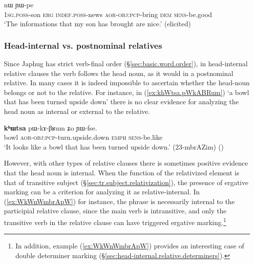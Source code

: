 \begin{exe}
\ex \label{ex:tWtCha.jAkAGWt}
 nɯ ɲɯ-pe \\
\textsc{1sg}.\textsc{poss}-son \textsc{erg} \textsc{indef}.\textsc{poss}-news \textsc{aor}-\textsc{obj}:\textsc{pcp}-bring \textsc{dem} \textsc{sens}-be.good \\
\glt `The informations that my son has brought are nice.' (elicited)
\end{exe} 
  
\subsubsection{Head-internal vs. postnominal relatives} \label{sec:head-internal.relative.postnominal}
 
Since Japhug has strict verb-final order (§\ref{sec:basic.word.order}), in head-internal relative clauses the verb follows the head noun, as it would in a postnominal relative. In many cases it is indeed impossible to ascertain whether the head-noun belongs or not to the relative. For instance, in (\ref{ex:khWtsa.pWkABRum})  `a bowl that has been turned upside down' there is no clear evidence for analyzing the head noun  as internal or external to the relative. 
  
\begin{exe}
\ex  \label{ex:khWtsa.pWkABRum}
\gll \textbf{kʰɯtsa} pɯ-kɤ-βʁum ʑo ɲɯ-fse. \\
bowl \textsc{aor}-\textsc{obj}:\textsc{pcp}-turn.upside.down \textsc{emph} \textsc{sens}-be.like \\
\glt `It looks like a bowl that has been turned upside down.' (23-mbrAZim)
()
\end{exe} 

However,  with other types of relative clauses there is sometimes positive evidence that the head noun is internal. When the function of the relativized element is that of transitive subject (§\ref{sec:tr.subject.relativization}), the presence of ergative marking can be a criterion for analyzing it as relative-internal. In (\ref{ex:WkWnWmbrApW}) for instance, the phrase  is necessarily internal to the participial relative clause, since the main verb  is intransitive, and only the transitive verb  in the relative clause can have triggered ergative marking.\footnote{In addition, example (\ref{ex:WkWnWmbrApW}) provides an interesting case of double determiner marking (§\ref{sec:head-internal.relative.determiners}). } 
  
